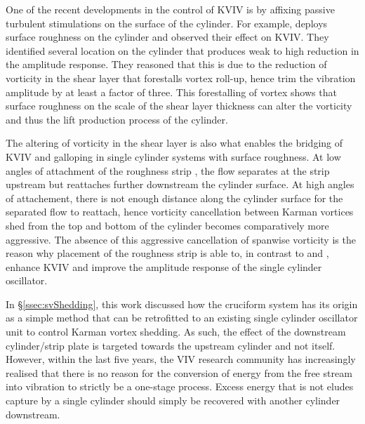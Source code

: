 \documentclass[oneside]{utmthesis}
\begin{document}
One of the recent developments in the control of KVIV is by affixing passive turbulent stimulations on the surface of the cylinder. For example, \citet{Park2016} deploys surface roughness on the cylinder and observed their effect on KVIV. They identified several location on the cylinder that produces weak to high reduction in the amplitude response. They reasoned that this is due to the reduction of vorticity in the shear layer that forestalls vortex roll-up, hence trim the vibration amplitude by at least a factor of three. This forestalling of vortex shows that surface roughness on the scale of the shear layer thickness can alter the vorticity and thus the lift production process of the cylinder.

The altering of vorticity in the shear layer is also what enables the bridging of KVIV and galloping in single cylinder systems with surface roughness. At low angles of attachment of the roughness strip \citep{Chang2011,Park2013}, the flow separates at the strip upstream but reattaches further downstream the cylinder surface. At high angles of attachement, there is not enough distance along the cylinder surface for the separated flow to reattach, hence vorticity cancellation between Karman vortices shed from the top and bottom of the cylinder becomes comparatively more aggressive. The absence of this aggressive cancellation of spanwise vorticity is the reason why placement of the roughness strip is able to, in contrast to \citet{Bernitsas2008c} and \citet{Park2016}, enhance KVIV and improve the amplitude response of the single cylinder oscillator.

In \S\ref{ssec:svShedding}, this work discussed how the cruciform system has its origin as a simple method that can be retrofitted to an existing single cylinder oscillator unit to control Karman vortex shedding. As such, the effect of the downstream cylinder/strip plate is targeted towards the upstream cylinder and not itself. However, within the last five years, the VIV research community has increasingly realised that there is no reason for the conversion of energy from the free stream into vibration to strictly be a one-stage process. Excess energy that is not eludes capture by a single cylinder should simply be recovered with another cylinder downstream.
\end{document}
